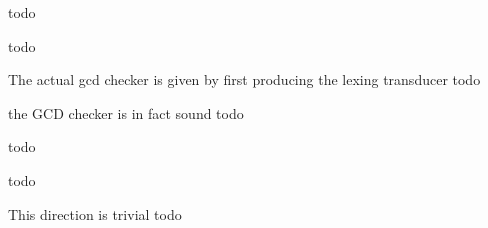\begin{definition}[Parser]
    \label{def:Parser}
    todo
\end{definition}

\begin{definition}[PreprocessParser]
    \label{def:PreprocessParser}
    todo
\end{definition}

\begin{definition}[GCDChecker]
    \label{def:GCDChecker}
    The actual gcd checker is given by first producing the lexing transducer
    todo
\end{definition}

\begin{theorem}
    the GCD checker is in fact sound
    todo 
\end{theorem}

\begin{theorem}
        
    todo 
\end{theorem}

\begin{theorem}
        
    todo 
\end{theorem}

\begin{theorem}
    This direction is trivial 
    todo 
\end{theorem}

